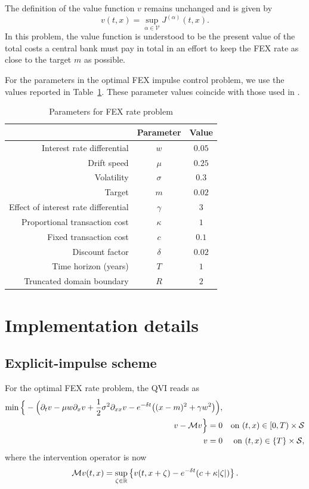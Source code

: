 The definition of the value function $v$ remains unchanged and is given by
\begin{equation*}
    v(t,x) = \sup_{\alpha \in \mathcal V} J^{(\alpha)}(t,x).
\end{equation*}
In this problem, the value function is understood to be the present value of the total costs a central bank must pay in total in an effort to keep the FEX rate as close to the target $m$ as possible. 

For the parameters in the optimal FEX impulse control problem, we use the values reported in Table~\ref{tab: FEX rate params}. These parameter values coincide with those used in \cite{azimzadeh2018impulsecontrolfinancenumerical}.
\begin{table}[H]
    \centering
    \begin{tabular}{rcc}
        \toprule
        & Parameter & Value \\
        \hline
        Interest rate differential & $w$ & $0.05$ \\
        Drift speed & $\mu$ & $0.25$ \\
        Volatility & $\sigma$ & $0.3$ \\
        Target & $m$ & $0.02$ \\
        Effect of interest rate differential & $\gamma$ & $3$ \\
        Proportional transaction cost & $\kappa$ & $1$ \\
        Fixed transaction cost & $c$ & $0.1$ \\
        Discount factor & $\delta$ & $0.02$ \\
        Time horizon (years) & $T$ & $1$ \\
        Truncated domain boundary & $R$ & $2$ \\
        \toprule
    \end{tabular}
    \caption{Parameters for FEX rate problem}
    \label{tab: FEX rate params}
\end{table}

\section{Implementation details}
\subsection{Explicit-impulse scheme}
For the optimal FEX rate problem, the QVI reads as
\begin{align*}
    \min \Big\{ - \Big( \partial_t v - \mu w \partial_x v + \frac{1}{2} \sigma^2 \partial_{xx} v - e^{-\delta t} \big( (x-m)^2 + \gamma w^2 \big) \Big), \\
    v - \mathcal{M} v \Big\} = 0 && \text{on } (t,x) \in [0,T) \times \mathcal{S} \\
    v = 0 && \text{on } (t,x) \in \{T\} \times \mathcal{S},
\end{align*}
where the intervention operator is now
\begin{equation*}
    \mathcal{M} v(t,x) = \sup_{\zeta \in \mathbb{R}} \left\{ v(t,x+\zeta) - e^{-\delta t}(c+\kappa |\zeta|) \right\}.
\end{equation*}

